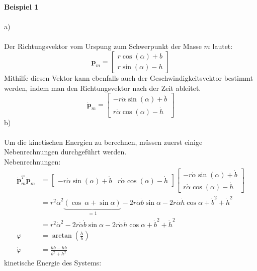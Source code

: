 \noindent
\textbf{Beispiel 1} \\ \\
a) \\ \\
Der Richtungsvektor vom Urspung zum Schwerpunkt der Masse $m$ lautet:
\[
	\textbf{p}_m = \left[ \begin {array}{c} r\cos \left( \alpha \right) +b
	\\ r\sin \left( \alpha \right) -h\end {array}
	\right]	
\]
Mithilfe diesen Vektor kann ebenfalls auch der Geschwindigkeitsvektor bestimmt werden, indem man den Richtungsvektor nach der Zeit ableitet.
\[
	\dot{\textbf{p}}_m =\left[ \begin {array}{c} -r \dot{\alpha}
	  \sin \left( \alpha 
	\right) + \dot{b} \\ 
	r \dot{\alpha} \cos \left( \alpha  \right) -
		\dot{h} \end {array} \right] 
\]
b) \\ \\
Um die kinetischen Energien zu berechnen, müssen zuerst einige Nebenrechnungen durchgeführt werden.\\
Nebenrechnungen:
\begin{align*}
	\dot{\textbf{p}}_m^T \dot{\textbf{p}}_m &= \left[ \begin{matrix}
		-r\dot{\alpha}\sin \left( \alpha \right) + \dot{b} & r\dot{\alpha}\cos \left( \alpha \right) -\dot{h}
	\end{matrix}\right] \left[ \begin {array}{c} -r \dot{\alpha}
	\sin \left( \alpha 
	\right) + \dot{b} \\ 
	r \dot{\alpha} \cos \left( \alpha  \right) -
	\dot{h} \end {array} \right] \\
	&= r^2\dot{\alpha}^2\underbrace{\left(\cos \ \alpha  + \sin  \alpha\right)  }_{=1} -2r\dot{\alpha}\dot{b}\sin\alpha - 2r\dot{\alpha}\dot{h}\cos\alpha + \dot{b}^2 + \dot{h}^2 \\
	&= r^2\dot{\alpha}^2 -2r\dot{\alpha}\dot{b}\sin\alpha - 2r\dot{\alpha}\dot{h}\cos\alpha + \dot{b}^2 + \dot{h}^2 \\
	\varphi &= \arctan\left(\frac{h}{b}\right) \\
	\dot{\varphi} &= \frac{\dot{h}b - h\dot{b}}{b^2 + h^2}
\end{align*}
kinetische Energie des Systems:
